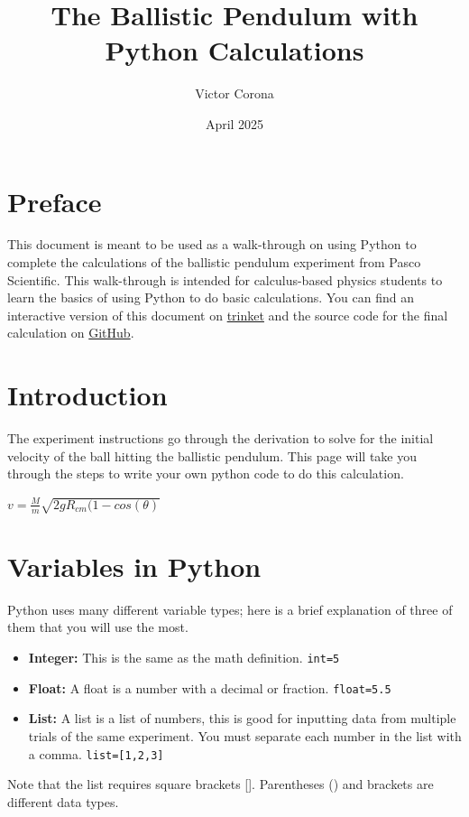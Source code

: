 \documentclass{article}
\title{The Ballistic Pendulum with Python Calculations}
\author{Victor Corona}
\date{April 2025}
\begin{document}
\maketitle

\section{Preface}
This document is meant to be used as a walk-through on using Python to complete the calculations of the ballistic pendulum experiment from Pasco Scientific. This walk-through is intended for calculus-based physics students to learn the basics of using Python to do basic calculations. You can find an interactive version of this document on \href{https://trinket.io/courses/join/RVASYC}{trinket} and the source code for the final calculation on \href{https://github.com/VictorCorona/BallisticPendulum}{GitHub}. 


\section{Introduction}
The experiment instructions go through the derivation to solve for the initial velocity of the ball hitting the ballistic pendulum. This page will take you through the steps to write your own python code to do this calculation.
\hfill
\begin{center}
  $v=\frac{M}{m} \sqrt{2gR_{cm}(1-cos(\theta)}$  
\end{center}

\section{Variables in Python}
Python uses many different variable types; here is a brief explanation of three of them that you will use the most.
\begin{itemize}
    \item \textbf{Integer:} This is the same as the math definition. \verb|int=5|
    \item \textbf{Float:} A float is a number with a decimal or fraction. \verb|float=5.5|
    \item \textbf{List:} A list is a list of numbers, this is good for inputting data from multiple trials of the same experiment. You must separate each number in the list with a comma. \verb|list=[1,2,3]|
\end{itemize}

Note that the list requires square brackets []. Parentheses () and brackets {} are different data types. 
\end{document}
